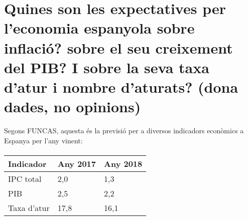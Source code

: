 \section{
  Quines son les expectatives per l’economia espanyola sobre inflació?
  sobre el seu creixement del PIB? 
  I sobre la seva taxa d’atur i nombre d’aturats? (dona
  dades, no opinions)
}

Segons FUNCAS\cite{funcas}, aquesta és la previsió per a 
diversos indicadors econòmics
a Espanya per l'any vinent:

\paragraph{}

\begin{tabular}{ | l | l | l | }
  \hline
  Indicador & Any 2017 & Any 2018 \\
  \hline
  IPC total & 2,0 & 1,3 \\
  PIB & 2,5 & 2,2 \\
  Taxa d'atur & 17,8 & 16,1 \\
  \hline
\end{tabular}
